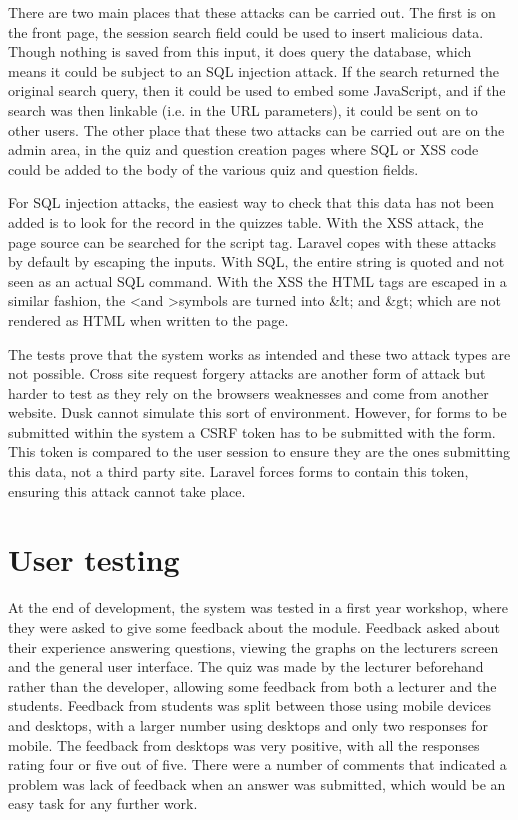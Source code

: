There are two main places that these attacks can be carried out. The first is on the front page, the session search field could be used to insert malicious data. Though nothing is saved from this input, it does query the database, which means it could be subject to an SQL injection attack. If the search returned the original search query, then it could be used to embed some JavaScript, and if the search was then linkable (i.e. in the URL parameters), it could be sent on to other users. The other place that these two attacks can be carried out are on the admin area, in the quiz and question creation pages where SQL or XSS code could be added to the body of the various quiz and question fields.

For SQL injection attacks, the easiest way to check that this data has not been added is to look for the record in the quizzes table. With the XSS attack, the page source can be searched for the script tag. Laravel copes with these attacks by default by escaping the inputs\cite{laravel-web-attacks}. With SQL, the entire string is quoted and not seen as an actual SQL command. With the XSS the HTML tags are escaped in a similar fashion, the \textless and \textgreater symbols are turned into \&lt; and \&gt; which are not rendered as HTML when written to the page\cite{laravel-web-attacks}.

The tests prove that the system works as intended and these two attack types are not possible. Cross site request forgery attacks are another form of attack but harder to test as they rely on the browsers weaknesses and come from another website. Dusk cannot simulate this sort of environment. However, for forms to be submitted within the system a CSRF token has to be submitted with the form. This token is compared to the user session to ensure they are the ones submitting this data, not a third party site. Laravel forces forms to contain this token, ensuring this attack cannot take place. 

\section{User testing}
At the end of development, the system was tested in a first year workshop, where they were asked to give some feedback about the module. Feedback asked about their experience answering questions, viewing the graphs on the lecturers screen and the general user interface. The quiz was made by the lecturer beforehand rather than the developer, allowing some feedback from both a lecturer and the students. Feedback from students was split between those using mobile devices and desktops, with a larger number using desktops and only two responses for mobile. The feedback from desktops was very positive, with all the responses rating four or five out of five. There were a number of comments that indicated a problem was lack of feedback when an answer was submitted, which would be an easy task for any further work.

